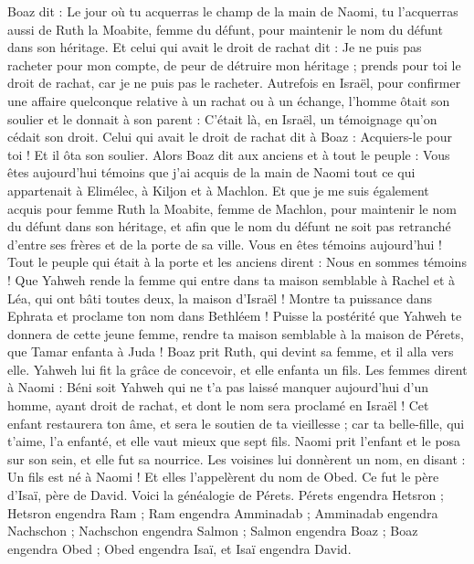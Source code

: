 \begin{multicols}{2}
Boaz dit : Le jour où tu acquerras le champ de la main de Naomi, tu l'acquerras aussi de Ruth la Moabite, femme du défunt, pour maintenir le nom du défunt dans son héritage.
Et celui qui avait le droit de rachat dit : Je ne puis pas racheter pour mon compte, de peur de détruire mon héritage ; prends pour toi le droit de rachat, car je ne puis pas le racheter.
Autrefois en Israël, pour confirmer une affaire quelconque relative à un rachat ou à un échange, l'homme ôtait son soulier et le donnait à son parent : C'était là, en Israël, un témoignage qu'on cédait son droit.
Celui qui avait le droit de rachat dit à Boaz : Acquiers-le pour toi ! Et il ôta son soulier.
Alors Boaz dit aux anciens et à tout le peuple : Vous êtes aujourd'hui témoins que j'ai acquis de la main de Naomi tout ce qui appartenait à Elimélec, à Kiljon et à Machlon.
Et que je me suis également acquis pour femme Ruth la Moabite, femme de Machlon, pour maintenir le nom du défunt dans son héritage, et afin que le nom du défunt ne soit pas retranché d'entre ses frères et de la porte de sa ville. Vous en êtes témoins aujourd'hui !
Tout le peuple qui était à la porte et les anciens dirent : Nous en sommes témoins ! Que Yahweh rende la femme qui entre dans ta maison semblable à Rachel et à Léa, qui ont bâti toutes deux, la maison d'Israël ! Montre ta puissance dans Ephrata et proclame ton nom dans Bethléem !
Puisse la postérité que Yahweh te donnera de cette jeune femme, rendre ta maison semblable à la maison de Pérets, que Tamar enfanta à Juda !
Boaz prit Ruth, qui devint sa femme, et il alla vers elle. Yahweh lui fit la grâce de concevoir, et elle enfanta un fils.
Les femmes dirent à Naomi : Béni soit Yahweh qui ne t'a pas laissé manquer aujourd'hui d'un homme, ayant droit de rachat, et dont le nom sera proclamé en Israël !
Cet enfant restaurera ton âme, et sera le soutien de ta vieillesse ; car ta belle-fille, qui t'aime, l'a enfanté, et elle vaut mieux que sept fils.
Naomi prit l'enfant et le posa sur son sein, et elle fut sa nourrice.
Les voisines lui donnèrent un nom, en disant : Un fils est né à Naomi ! Et elles l'appelèrent du nom de Obed. Ce fut le père d'Isaï, père de David.
Voici la généalogie de Pérets. Pérets engendra Hetsron ;
Hetsron engendra Ram ; Ram engendra Amminadab ;
Amminadab engendra Nachschon ; Nachschon engendra Salmon ;
Salmon engendra Boaz ; Boaz engendra Obed ;
Obed engendra Isaï, et Isaï engendra David.
\PPE{}
\end{multicols}